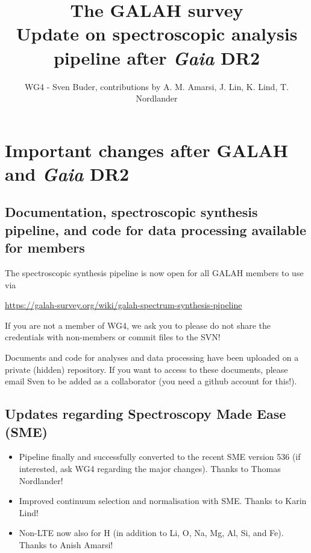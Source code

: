 \documentclass[a4paper,11pt,english]{article}
\begin{document}
\title{\textbf{The GALAH survey} \\ Update on spectroscopic analysis pipeline after \textit{Gaia} DR2}
\author{WG4 - Sven Buder, contributions by A. M. Amarsi, J. Lin, K. Lind, T. Nordlander}

\maketitle

\section{Important changes after GALAH and \textit{Gaia} DR2}

\subsection{Documentation, spectroscopic synthesis pipeline, and code for data processing available for members}

The spectroscopic synthesis pipeline is now open for all GALAH members to use via

\url{https://galah-survey.org/wiki/galah-spectrum-synthesis-pipeline}

If you are not a member of WG4, we ask you to please do not share the credentials with non-members or commit files to the SVN!

Documents and code for analyses and data processing have been uploaded on a private (hidden) repository. If you want to access to these documents, please email Sven to be added as a collaborator (you need a github account for this!).

\subsection{Updates regarding Spectroscopy Made Ease (SME)}

\begin{itemize}
\item Pipeline finally and successfully converted to the recent SME version 536 (if interested, ask WG4 regarding the major changes). Thanks to Thomas Nordlander!
\item Improved continuum selection and normalisation with SME. Thanks to Karin Lind!
\item Non-LTE now also for H (in addition to Li, O, Na, Mg, Al, Si, and Fe). Thanks to Anish Amarsi!
\end{itemize}
\end{document}

